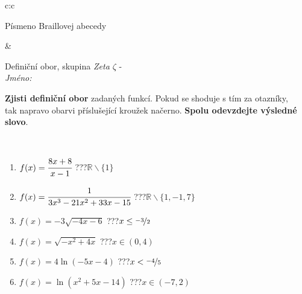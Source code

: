 \documentclass[10pt]{report}
\begin{document}
\begin{tabular}{c:c}
\begin{minipage}[c][104.5mm][t]{0.5\linewidth}
\begin{center}
\begin{minipage}{0.20\linewidth}
\begin{center}
{\small Písmeno Braillovej abecedy}
\end{center}
\end{minipage}
\end{center}
\end{minipage}
&
\begin{minipage}[c][104.5mm][t]{0.5\linewidth}
\begin{center}
\vspace{7mm}
{\huge Definiční obor, skupina \textit{Zeta $\zeta$} -}\\[5mm]
\textit{Jméno:}\phantom{xxxxxxxxxxxxxxxxxxxxxxxxxxxxxxxxxxxxxxxxxxxxxxxxxxxxxxxxxxxxxxxxx}\\[5mm]
\begin{minipage}{0.95\linewidth}
\begin{center}
\textbf{Zjisti definiční obor} zadaných funkcí. Pokud se shoduje s tím za otazníky,\\tak napravo obarvi příslušející kroužek načerno. \textbf{Spolu odevzdejte výsledné slovo}.
\end{center}
\end{minipage}
\\[1mm]
\begin{minipage}{0.79\linewidth}
\begin{center}
\begin{varwidth}{\linewidth}
\begin{enumerate}
\normalsizerrr
\item $f(x)=\cfrac{8x+8}{x-1}$\quad \dotfill\; ???\;\dotfill \quad $\mathbb{R}\smallsetminus\{1\}$
\item $f(x)=\cfrac{1}{3x^3-21x^2+33x-15}$\quad \dotfill\; ???\;\dotfill \quad $\mathbb{R}\smallsetminus\{1,-1,7\}$
\item $f(x)=-3\sqrt{-4x-6}$\quad \dotfill\; ???\;\dotfill \quad $x\leq\nicefrac{-3}{2}$
\item $f(x)=\sqrt{-x^2+4x}$\quad \dotfill\; ???\;\dotfill \quad $x\in(0 , 4)$
\item $f(x)=4\ln{(-5x-4)}$\quad \dotfill\; ???\;\dotfill \quad $x<\nicefrac{-4}{5}$
\item $f(x)=\ln{(x^2+5x-14)}$\quad \dotfill\; ???\;\dotfill \quad $x\in(-7 , 2)$
\end{enumerate}
\end{varwidth}
\end{center}
\end{minipage}
\begin{minipage}{0.20\linewidth}
\begin{center}

\end{center}
\end{minipage}
\end{center}
\end{minipage}
\end{tabular}
\end{document}
